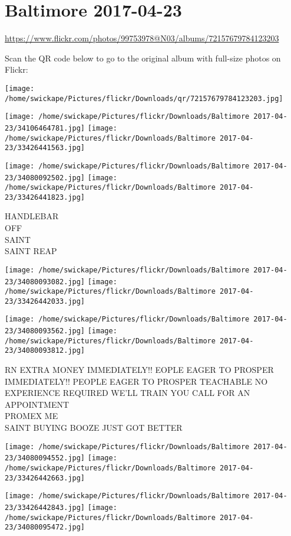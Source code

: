 \documentclass[10pt,letterpaper]{article}
\title{}
\author{}
\date{}
\begin{document}
\section*{Baltimore 2017-04-23}

\url{https://www.flickr.com/photos/99753978@N03/albums/72157679784123203}

Scan the QR code below to go to the original album with full-size photos on Flickr:

\texttt{[image: /home/swickape/Pictures/flickr/Downloads/qr/72157679784123203.jpg]}
\pagebreak

\texttt{[image: /home/swickape/Pictures/flickr/Downloads/Baltimore 2017-04-23/34106464781.jpg]}
\texttt{[image: /home/swickape/Pictures/flickr/Downloads/Baltimore 2017-04-23/33426441563.jpg]}

\texttt{[image: /home/swickape/Pictures/flickr/Downloads/Baltimore 2017-04-23/34080092502.jpg]}
\texttt{[image: /home/swickape/Pictures/flickr/Downloads/Baltimore 2017-04-23/33426441823.jpg]}

HANDLEBAR\\
OFF\\
SAINT\\
SAINT REAP
\pagebreak

\texttt{[image: /home/swickape/Pictures/flickr/Downloads/Baltimore 2017-04-23/34080093082.jpg]}
\texttt{[image: /home/swickape/Pictures/flickr/Downloads/Baltimore 2017-04-23/33426442033.jpg]}

\texttt{[image: /home/swickape/Pictures/flickr/Downloads/Baltimore 2017-04-23/34080093562.jpg]}
\texttt{[image: /home/swickape/Pictures/flickr/Downloads/Baltimore 2017-04-23/34080093812.jpg]}

RN EXTRA MONEY IMMEDIATELY!! EOPLE EAGER TO PROSPER\\
IMMEDIATELY!!  PEOPLE EAGER TO PROSPER TEACHABLE NO EXPERIENCE REQUIRED WE'LL TRAIN YOU CALL FOR AN APPOINTMENT\\
PROMEX ME\\
SAINT BUYING BOOZE JUST GOT BETTER
\pagebreak

\texttt{[image: /home/swickape/Pictures/flickr/Downloads/Baltimore 2017-04-23/34080094552.jpg]}
\texttt{[image: /home/swickape/Pictures/flickr/Downloads/Baltimore 2017-04-23/33426442663.jpg]}

\texttt{[image: /home/swickape/Pictures/flickr/Downloads/Baltimore 2017-04-23/33426442843.jpg]}
\texttt{[image: /home/swickape/Pictures/flickr/Downloads/Baltimore 2017-04-23/34080095472.jpg]}
\end{document}
